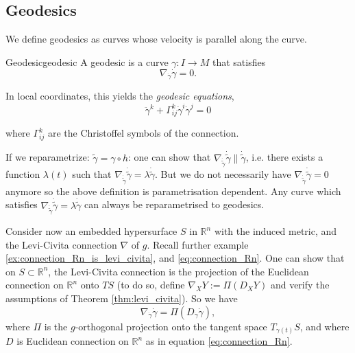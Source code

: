 \subsection{Geodesics}

We define geodesics as curves whose velocity is parallel along the curve.

\begin{colordef}{Geodesic}{geodesic}
A geodesic is a curve $\gamma: I \to M$ that satisfies
\[
\nabla_{\dot{\gamma}} \dot{\gamma} = 0.
\]
\end{colordef}

In local coordinates, this yields the \emph{geodesic equations},
\begin{equation}
    \label{eq:geodesic_equation}
    \ddot{\gamma}^k + \Gamma_{ij}^k \dot{\gamma}^i \dot{\gamma}^j = 0
\end{equation}

where $\Gamma_{ij}^k$ are the Christoffel symbols of the connection.

\begin{colremark}
If we reparametrize: $\tilde\gamma = \gamma \circ h$: one can show that $\nabla_{\dot{\tilde\gamma}} \dot{\tilde\gamma} \parallel \dot{\tilde\gamma}$, i.e. there exists a function $\lambda(t)$ such that $\nabla_{\dot{\tilde\gamma}} \dot{\tilde\gamma} =\lambda \dot{\tilde\gamma}$. But we do not necessarily have $\nabla_{\dot{\tilde\gamma}} \dot{\tilde\gamma}=0$ anymore so the above definition is parametrisation dependent. Any curve which satisfies $\nabla_{\dot{\tilde\gamma}} \dot{\tilde\gamma} =\lambda \dot{\tilde\gamma}$ can always be reparametrised to geodesics.
\end{colremark}



Consider now an embedded hypersurface $S$ in $\mathbb{R}^n$ with the induced metric, and the Levi-Civita connection $\nabla$ of $g$. Recall further example \ref{ex:connection_Rn_is_levi_civita}, and \eqref{eq:connection_Rn}. One can show that on $S\subset \mathbb{R}^n$, the Levi-Civita connection is the projection of the Euclidean connection on $\mathbb{R}^n$ onto $TS$ (to do so, define $\nabla_X Y:=\Pi(D_X Y)$ and verify the assumptions of Theorem \ref{thm:levi_civita}). So we have
\[\nabla_{\dot{\gamma}} \dot{\gamma} = \Pi(D_{\dot{\gamma}} \dot{\gamma}),\]
where $\Pi$ is the $g$-orthogonal projection onto the tangent space $T_{\gamma(t)}S$, and where $D$ is Euclidean connection on $\mathbb{R}^n$ as in equation \eqref{eq:connection_Rn}.

